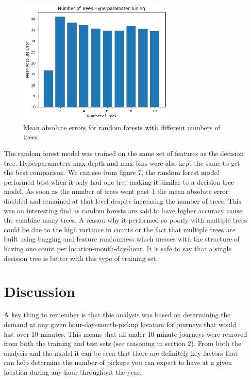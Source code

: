 \documentclass[11pt]{article}
\begin{document}
\begin{figure}[h]
    \includegraphics[width=0.7\textwidth]{plots/param.png}
    \centering
    \caption{Mean absolute errors for random forests with different numbers of trees} %
\end{figure}

The random forest model was trained on the same set of features as the decision tree. Hyperparameters max depth and max bins were also kept the same to get the best comparison. We can see from figure 7, the random forest model performed best when it only had one tree making it similar to a decision tree model. As soon as the number of trees went past 1 the mean absolute error doubled and remained at that level despite increasing the number of trees. This was an interesting find as random forests are said to have higher accuracy cause the combine many trees. A reason why it performed so poorly with multiple trees could be due to the high variance in counts or the fact that multiple trees are built using bagging and feature randomness which messes with the structure of having one count per location-month-day-hour. It is safe to say that a single decision tree is better with this type of training set.

\section{Discussion}
A key thing to remember is that this analysis was based on determining the demand at any given hour-day-month-pickup location for journeys that would last over 10 minutes. This means that all under 10-minute journeys were removed from both the training and test sets (see reasoning in section 2). From both the analysis and the model it can be seen that there are definitely key factors that can help determine the number of pickups you can expect to have at a given location during any hour throughout the year. 
\end{document}
